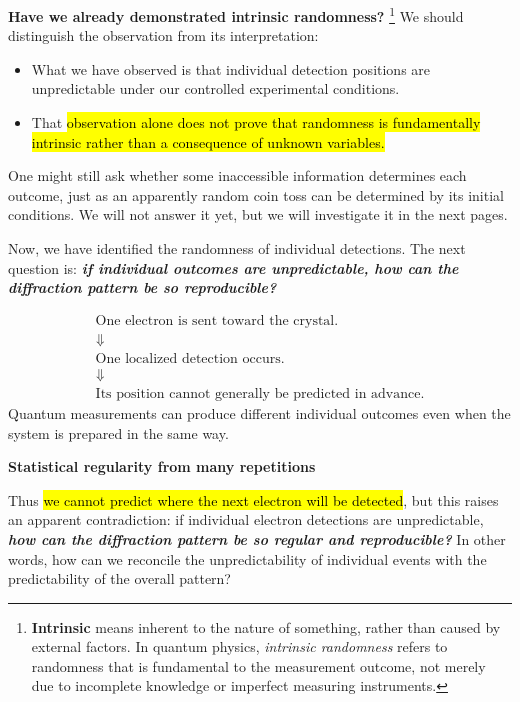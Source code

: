 \highspace
\textcolor{Green3}{ \textbf{Have we already demonstrated intrinsic randomness?}}
\footnote{\textbf{Intrinsic} means inherent to the nature of something, rather than caused by external factors. In quantum physics, \emph{intrinsic randomness} refers to randomness that is fundamental to the measurement outcome, not merely due to incomplete knowledge or imperfect measuring instruments.} We should distinguish the observation from its interpretation:
\begin{itemize}
    \item What we have observed is that individual detection positions are unpredictable under our controlled experimental conditions.
    \item That \hl{observation alone does not prove that randomness is fundamentally intrinsic rather than a consequence of unknown variables.}
\end{itemize}
One might still ask whether some inaccessible information determines each outcome, just as an apparently random coin toss can be determined by its initial conditions. We will not answer it yet, but we will investigate it in the next pages.

\highspace
Now, we have identified the randomness of individual detections. The next question is: \emph{\textbf{if individual outcomes are unpredictable, how can the diffraction pattern be so reproducible?}}

\highspace
\begin{takeawaysbox}
    \begin{equation*}
        \begin{gathered}
            \text{One electron is sent toward the crystal.}\\
            \Downarrow\\
            \text{One localized detection occurs.}\\
            \Downarrow\\
            \text{Its position cannot generally be predicted in advance.}
        \end{gathered}
    \end{equation*}
    Quantum measurements can produce different individual outcomes even when the system is prepared in the same way.
\end{takeawaysbox}

\newpage

\begin{flushleft}
    \textcolor{Green3}{ \textbf{Statistical regularity from many repetitions}}
\end{flushleft}
Thus \hl{we cannot predict where the next electron will be detected}, but this raises an apparent contradiction: if individual electron detections are unpredictable, \textbf{\emph{how can the diffraction pattern be so regular and reproducible?}} In other words, how can we reconcile the unpredictability of individual events with the predictability of the overall pattern?

